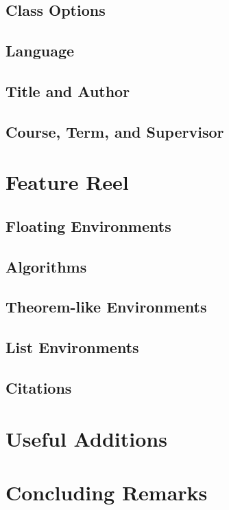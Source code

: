 \documentclass[logo]{mlai-report}
\begin{document}
	\subsection{Class Options} 
	
	\subsection{Language} 
	
	\subsection{Title and Author}
	
	\subsection{Course, Term, and Supervisor} 
	
	\section{Feature Reel} 
	
	\subsection{Floating Environments} 
	
	\subsection{Algorithms}
	
	\subsection{Theorem-like Environments} 
	
	\subsection{List Environments} 
	
	\subsection{Citations} 
	
	\section{Useful Additions} 
	
	\section{Concluding Remarks}
	
\end{document}
